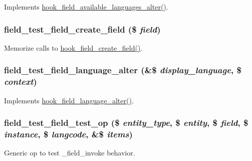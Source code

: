 \label{field__test_8module_a0a6f85b074751f24280d72b415dab142}
Implements \hyperlink{group__field__attach_gaea2e719de3ad070e161d0d386dd18303}{hook\_\-field\_\-available\_\-languages\_\-alter()}. \hypertarget{field__test_8module_a7932459be94e84648d5dbcd0f5607879}{
\subsubsection[{field\_\-test\_\-field\_\-create\_\-field}]{\setlength{\rightskip}{0pt plus 5cm}field\_\-test\_\-field\_\-create\_\-field (\$ {\em field})}}
\label{field__test_8module_a7932459be94e84648d5dbcd0f5607879}
Memorize calls to \hyperlink{group__field__crud_ga925648157864b55f553f5d2d31e2bf1b}{hook\_\-field\_\-create\_\-field()}. \hypertarget{field__test_8module_a79a1254b2e78af563bb7d87e5f36fdd9}{
\subsubsection[{field\_\-test\_\-field\_\-language\_\-alter}]{\setlength{\rightskip}{0pt plus 5cm}field\_\-test\_\-field\_\-language\_\-alter (\&\$ {\em display\_\-language}, \/  \$ {\em context})}}
\label{field__test_8module_a79a1254b2e78af563bb7d87e5f36fdd9}
Implements \hyperlink{group__field__attach_ga6411d5b5a528850a6e53c87ff899cabc}{hook\_\-field\_\-language\_\-alter()}. \hypertarget{field__test_8module_acf091a4178bd84d202a69e32e2b46a12}{
\subsubsection[{field\_\-test\_\-field\_\-test\_\-op}]{\setlength{\rightskip}{0pt plus 5cm}field\_\-test\_\-field\_\-test\_\-op (\$ {\em entity\_\-type}, \/  \$ {\em entity}, \/  \$ {\em field}, \/  \$ {\em instance}, \/  \$ {\em langcode}, \/  \&\$ {\em items})}}
\label{field__test_8module_acf091a4178bd84d202a69e32e2b46a12}
Generic op to test \_\-field\_\-invoke behavior.

